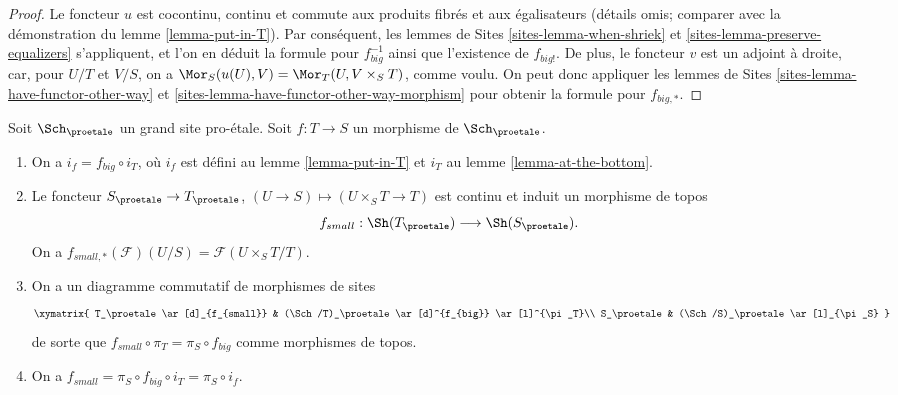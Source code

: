 \begin{proof}
Le foncteur $u$ est cocontinu, continu et commute aux produits fibrés
et aux égalisateurs (détails omis; comparer avec la démonstration du
lemme \ref{lemma-put-in-T}). Par conséquent, les
lemmes de Sites \ref{sites-lemma-when-shriek} et
\ref{sites-lemma-preserve-equalizers}
s'appliquent, et l'on en déduit la formule
pour $f_{big}^{-1}$ ainsi que l'existence de $f_{big!}$. De plus,
le foncteur $v$ est un adjoint à droite, car, pour $U/T$ et $V/S$,
on a $\Mor_S(u(U), V) = \Mor_T(U, V \times_S T)$,
comme voulu. On peut donc appliquer les
lemmes de Sites \ref{sites-lemma-have-functor-other-way} et
\ref{sites-lemma-have-functor-other-way-morphism}
pour obtenir la formule pour $f_{big, *}$.
\end{proof}

\begin{lemma}
\label{lemma-morphism-big-small}
Soit $\Sch_\proetale$ un grand site pro-\'etale.
Soit $f : T \to S$ un morphisme de $\Sch_\proetale$.
\begin{enumerate}
\item On a $i_f = f_{big} \circ i_T$, où $i_f$ est défini au
lemme \ref{lemma-put-in-T} et $i_T$ au
lemme \ref{lemma-at-the-bottom}.
\item Le foncteur $S_\proetale \to T_\proetale$,
$(U \to S) \mapsto (U \times_S T \to T)$ est continu et induit
un morphisme de topos
$$
f_{small} : \Sh(T_\proetale) \longrightarrow \Sh(S_\proetale).
$$
On a $f_{small, *}(\mathcal{F})(U/S) = \mathcal{F}(U \times_S T/T)$.
\item On a un diagramme commutatif de morphismes de sites
$$
\xymatrix{
T_\proetale \ar[d]_{f_{small}} &
(\Sch/T)_\proetale \ar[d]^{f_{big}} \ar[l]^{\pi_T}\\
S_\proetale &
(\Sch/S)_\proetale \ar[l]_{\pi_S}
}
$$
de sorte que $f_{small} \circ \pi_T = \pi_S \circ f_{big}$ comme morphismes de topos.
\item On a $f_{small} = \pi_S \circ f_{big} \circ i_T = \pi_S \circ i_f$.
\end{enumerate}
\end{lemma}


